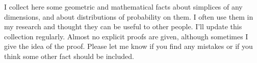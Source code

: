 \documentclass[\ifafour a4paper,12pt,\else a5paper,10pt,\fi%
onecolumn,oneside,article,%
british%
]{memoir}
\title{\propertitle}
\author{%
\hspace*{\stretch{1}}%
\parbox{0.75\linewidth}%
{\protect\centering P.G.L.  Porta Mana\\%
\footnotesize Kavli Institute, Trondheim \quad \epost{\email{pgl}{portamana.org}}}%
\hspace*{\stretch{1}}%
}
\date{\firstpublished; updated \updated}
\theoremstyle{remark}
\theoremstyle{innote}
\newcommand*{\amp}{\&}
\newcommand*{\asudedication}[1]{%
{\par\centering\textit{#1}\par}}
\renewcommand*{\|}[1][]{\nonscript\,#1\vert\nonscript\;\mathopen{}}
\begin{document}
\captiondelim{\quad}\captionnamefont{\footnotesize}\captiontitlefont{\footnotesize}
\frenchspacing
\maketitle

\abstractrunin
\abslabeldelim{}
\renewcommand*{\abstractname}{}
\setlength{\absleftindent}{0pt}
\setlength{\absrightindent}{0pt}
\setlength{\abstitleskip}{-\absparindent}
\begin{abstract}%
  \noindent A collection of geometric and mathematical facts about
  simplices of any dimension and about probability distributions on them.
  This collection is regularly updated \\\noindent\emph{\footnotesize Note:
    Dear Reader \amp\ Peer, this manuscript is being peer-reviewed by you.
    Thank you.}
\end{abstract}
\frenchspacing





\bigskip

I collect here some geometric and mathematical facts about simplices of any
dimensions, and about distributions of probability on them. I often use
them in my research and thought they can be useful to other people. I'll
update this collection regularly. Almost no explicit proofs are given,
although sometimes I give the idea of the proof. Please let me know if you
find any mistakes or if you think some other fact should be included.
\end{document}
